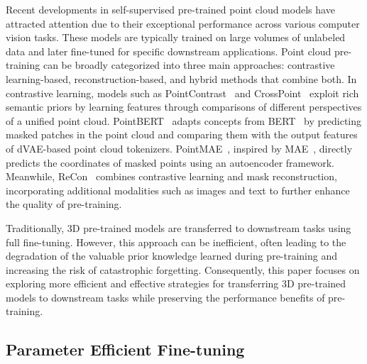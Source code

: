 
Recent developments in self-supervised pre-trained point cloud models have attracted attention due to their exceptional performance across various computer vision tasks. 
These models are typically trained on large volumes of unlabeled data and later fine-tuned for specific downstream applications. 
Point cloud pre-training can be broadly categorized into three main approaches: contrastive learning-based, reconstruction-based, and hybrid methods that combine both. In contrastive learning, models such as PointContrast~\cite{xie2020pointcontrast} and CrossPoint~\cite{afham2022crosspoint} exploit rich semantic priors by learning features through comparisons of different perspectives of a unified point cloud. PointBERT~\cite{yu2022point} adapts concepts from BERT~\cite{devlin2018bert} by predicting masked patches in the point cloud and comparing them with the output features of dVAE-based point cloud tokenizers. PointMAE~\cite{pang2022masked}, inspired by MAE~\cite{he2022masked}, directly predicts the coordinates of masked points using an autoencoder framework. Meanwhile, ReCon~\cite{qi2023contrast} combines contrastive learning and mask reconstruction, incorporating additional modalities such as images and text to further enhance the quality of pre-training.

Traditionally, 3D pre-trained models are transferred to downstream tasks using full fine-tuning. However, this approach can be inefficient, often leading to the degradation of the valuable prior knowledge learned during pre-training and increasing the risk of catastrophic forgetting. Consequently, this paper focuses on exploring more efficient and effective strategies for transferring 3D pre-trained models to downstream tasks while preserving the performance benefits of pre-training.

\subsection{Parameter Efficient Fine-tuning}

